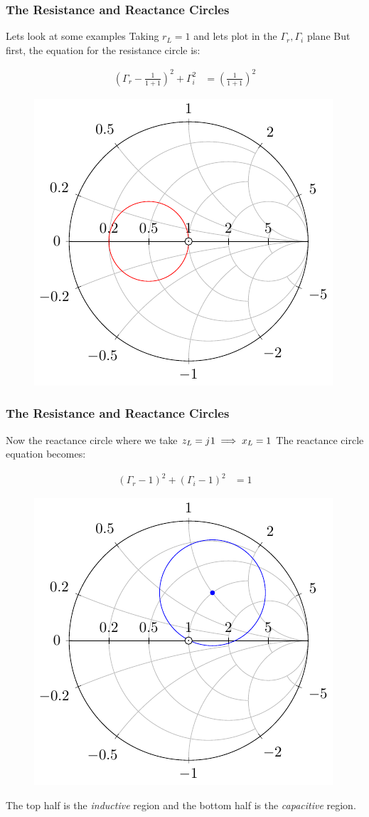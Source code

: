 \documentclass[10pt, compress]{beamer}
\renewcommand{\j}{{j}\mkern1mu} %
\begin{document}
\begin{frame}
    \frametitle{The Resistance and Reactance Circles}
    \begin{outline}
        \1 Lets look at some examples
        \2 Taking $r_L = 1$ and lets plot in the $\Gamma_r ,\Gamma_i$ plane
        \2 But first, the equation for the resistance circle is:
    \end{outline}
    \begin{align*}
        \left(\Gamma_{r} - \frac{1}{1+1}\right)^{2} + \Gamma_{i}^{2} & = \left(\frac{1}{1+1}\right)^{2}
    \end{align*}
    \begin{figure}[h]
        \centering
        \includegraphics[width=.4\textwidth]{smith_resistance.pdf}
    \end{figure}
\end{frame}

\begin{frame}
    \frametitle{The Resistance and Reactance Circles}

    \begin{outline}
        \1 Now the reactance circle where we take $z_L = \j 1 \implies x_L = 1$
        \1 The reactance circle equation becomes:
    \end{outline}
    \begin{align*}
        \left(\Gamma_{r}-1\right)^{2}+\left(\Gamma_{i}-1\right)^{2} & = 1
    \end{align*}
    \begin{figure}[h]
        \centering
        \includegraphics[width=.3\textwidth]{smith_reactance_circle.pdf}
    \end{figure}
    The top half is the \textit{inductive} region and the bottom half is the \textit{capacitive} region.
\end{frame}
\end{document}
